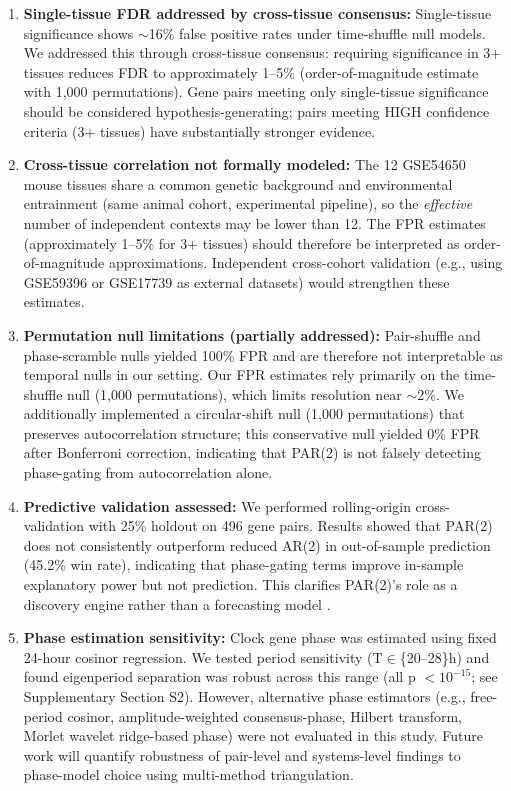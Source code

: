 \documentclass[11pt,a4paper]{article}
\begin{document}
\begin{enumerate}
    \item \textbf{Single-tissue FDR addressed by cross-tissue consensus:} Single-tissue significance shows $\sim$16\% false positive rates under time-shuffle null models. We addressed this through cross-tissue consensus: requiring significance in 3+ tissues reduces FDR to approximately 1--5\% (order-of-magnitude estimate with 1,000 permutations). Gene pairs meeting only single-tissue significance should be considered hypothesis-generating; pairs meeting HIGH confidence criteria (3+ tissues) have substantially stronger evidence.
    
    \item \textbf{Cross-tissue correlation not formally modeled:} The 12 GSE54650 mouse tissues share a common genetic background and environmental entrainment (same animal cohort, experimental pipeline), so the \textit{effective} number of independent contexts may be lower than 12. The FPR estimates (approximately 1--5\% for 3+ tissues) should therefore be interpreted as order-of-magnitude approximations. Independent cross-cohort validation (e.g., using GSE59396 or GSE17739 as external datasets) would strengthen these estimates.
    
    \item \textbf{Permutation null limitations (partially addressed):} Pair-shuffle and phase-scramble nulls yielded 100\% FPR and are therefore not interpretable as temporal nulls in our setting. Our FPR estimates rely primarily on the time-shuffle null (1,000 permutations), which limits resolution near $\sim$2\%. We additionally implemented a circular-shift null (1,000 permutations) that preserves autocorrelation structure; this conservative null yielded 0\% FPR after Bonferroni correction, indicating that PAR(2) is not falsely detecting phase-gating from autocorrelation alone.
    
    \item \textbf{Predictive validation assessed:} We performed rolling-origin cross-validation with 25\% holdout on 496 gene pairs. Results showed that PAR(2) does not consistently outperform reduced AR(2) in out-of-sample prediction (45.2\% win rate), indicating that phase-gating terms improve in-sample explanatory power but not prediction. This clarifies PAR(2)'s role as a discovery engine rather than a forecasting model \citep{shmueli2010explain}.
    
    \item \textbf{Phase estimation sensitivity:} Clock gene phase was estimated using fixed 24-hour cosinor regression. We tested period sensitivity (T$\in$\{20--28\}h) and found eigenperiod separation was robust across this range (all p $< 10^{-15}$; see Supplementary Section S2). However, alternative phase estimators (e.g., free-period cosinor, amplitude-weighted consensus-phase, Hilbert transform, Morlet wavelet ridge-based phase) were not evaluated in this study. Future work will quantify robustness of pair-level and systems-level findings to phase-model choice using multi-method triangulation.
    

\end{enumerate}
\end{document}
